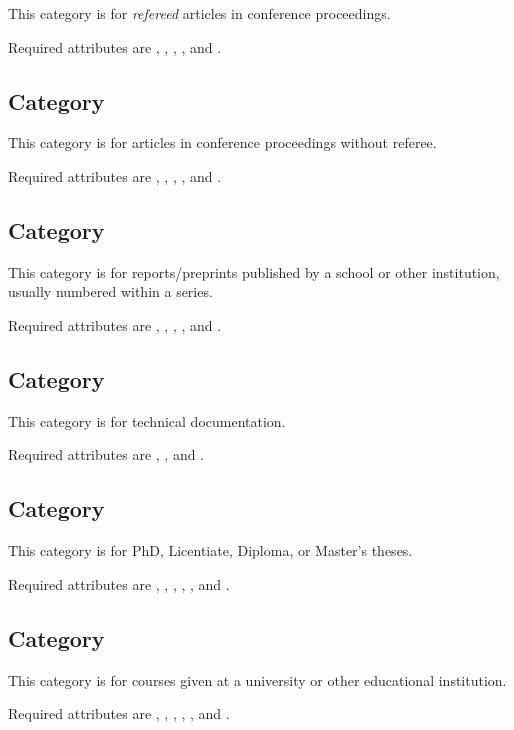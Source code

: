 This category is for \emph{refereed} articles in conference
proceedings.

Required attributes are , , ,
, and .

\subsection{Category }

This category is for articles in conference proceedings without
referee.

Required attributes are , , ,
, and .

\subsection{Category }

This category is for reports/preprints published by a school or other
institution, usually numbered within a series.

Required attributes are , , ,
, and .

\subsection{Category }

This category is for technical documentation.

Required attributes are , , and .

\subsection{Category }

This category is for PhD, Licentiate, Diploma, or Master's theses.

Required attributes are , , ,
, , and .

\subsection{Category }

This category is for courses given at a university or other
educational institution.

Required attributes are , , ,
, , and .

